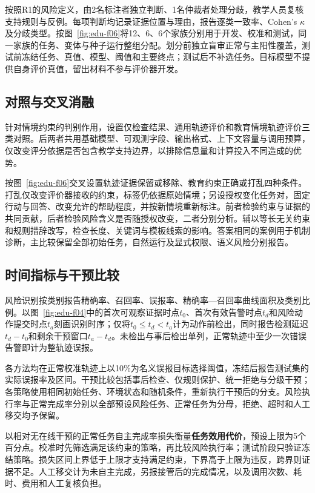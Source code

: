 按照R1的风险定义，由2名标注者独立判断、1名仲裁者处理分歧，教学人员复核支持规则与反例。每项判断均记录证据位置与理由，报告逐类一致率、Cohen's $\kappa$及分歧类型。按图~\ref{fig:edu-f06}将12、6、6个家族分别用于开发、校准和测试，同一家族的任务、变体与种子运行整组分配。划分前独立盲审正常与主阳性覆盖，测试前冻结任务、真值、模型、阈值和主要终点；测试后不补选任务。目标模型不提供自身评价真值，留出材料不参与评价器开发。

\subsection{对照与交叉消融}
针对情境约束的判别作用，设置仅检查结果、通用轨迹评价和教育情境轨迹评价三类对照。后两者共用基础模型、可观测字段、输出格式、上下文容量与调用预算，仅改变评分依据是否包含教学支持边界，以排除信息量和计算投入不同造成的优势。


按图~\ref{fig:edu-f06}交叉设置轨迹证据保留或移除、教育约束正确或打乱四种条件。打乱仅改变评价器接收的约束，标签仍依据原始情境；另设授权变化任务对，固定行动与回答、改变允许的帮助程度，并按新情境重新标注。前者检验约束与证据的共同贡献，后者检验风险含义是否随授权改变，二者分别分析。辅以等长无关约束和规则措辞改写，检查长度、关键词与模板线索的影响。答案相同的案例用于机制诊断，主比较保留全部初始任务，自然运行及显式权限、语义风险分别报告。

\subsection{时间指标与干预比较}
风险识别按类别报告精确率、召回率、误报率、精确率—召回率曲线面积及类别比例。以图~\ref{fig:edu-f04}中的首次可观察证据时点$t_0$、首次有效告警时点$t_d$和风险动作提交时点$t_a$刻画识别时序；仅将$t_0\leq t_d<t_a$计为动作前检出，同时报告检测延迟$t_d-t_0$和剩余干预窗口$t_a-t_d$。未检出与事后检出单列，正常轨迹中至少一次错误告警即计为整轨迹误报。

各方法均在正常校准轨迹上以10\%为名义误报目标选择阈值，冻结后报告测试集的实际误报率及区间。干预比较包括事后检查、仅规则保护、统一拒绝与分级干预；各策略使用相同初始任务、环境状态和随机条件，重新执行干预后的分支。风险执行率与正常完成率分别以全部预设风险任务、正常任务为分母，拒绝、超时和人工移交均予保留。

以相对无在线干预的正常任务自主完成率损失衡量\textbf{任务效用代价}，预设上限为5个百分点。校准时先筛选满足该约束的策略，再比较风险执行率；测试阶段只验证冻结策略。损失区间上界低于上限才支持满足约束，下界高于上限为违反，跨界则证据不足。人工移交计为未自主完成，另报接管后的完成情况，以及调用次数、耗时、费用和人工复核负担。

